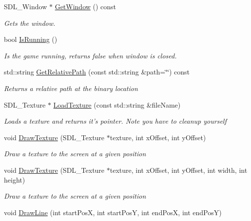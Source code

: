 \begin{DoxyCompactItemize}
\item 
S\+D\+L\+\_\+\+Window $\ast$ \hyperlink{class_f_w_application_a0bd2e7dab8d26d674ec89803ab4789d3}{Get\+Window} () const 
\begin{DoxyCompactList}\small\item\em Gets the window. \end{DoxyCompactList}\item 
bool \hyperlink{class_f_w_application_ae8002752e6cf2a9a602a55a0f8db2873}{Is\+Running} ()
\begin{DoxyCompactList}\small\item\em Is the game running, returns false when window is closed. \end{DoxyCompactList}\item 
std\+::string \hyperlink{class_f_w_application_a3d6a38a6314d281f6793d24951eaaed7}{Get\+Relative\+Path} (const std\+::string \&path=\char`\"{}\char`\"{}) const 
\begin{DoxyCompactList}\small\item\em Returns a relative path at the binary location \end{DoxyCompactList}\item 
S\+D\+L\+\_\+\+Texture $\ast$ \hyperlink{class_f_w_application_aa103aa5ee7cdbe5e2cae01fcdfb19472}{Load\+Texture} (const std\+::string \&file\+Name)
\begin{DoxyCompactList}\small\item\em Loads a texture and returns it's pointer. Note you have to cleanup yourself \end{DoxyCompactList}\item 
void \hyperlink{class_f_w_application_a015406b6f70c8edb674bb0f50516500c}{Draw\+Texture} (S\+D\+L\+\_\+\+Texture $\ast$texture, int x\+Offset, int y\+Offset)
\begin{DoxyCompactList}\small\item\em Draw a texture to the screen at a given position \end{DoxyCompactList}\item 
void \hyperlink{class_f_w_application_a6d9a4dc3068d15272c143b89cc22934e}{Draw\+Texture} (S\+D\+L\+\_\+\+Texture $\ast$texture, int x\+Offset, int y\+Offset, int width, int height)
\begin{DoxyCompactList}\small\item\em Draw a texture to the screen at a given position \end{DoxyCompactList}\item 
void \hyperlink{class_f_w_application_aace2f8e1125300546dc796cf74e34314}{Draw\+Line} (int start\+Pos\+X, int start\+Pos\+Y, int end\+Pos\+X, int end\+Pos\+Y)

\end{DoxyCompactItemize}
